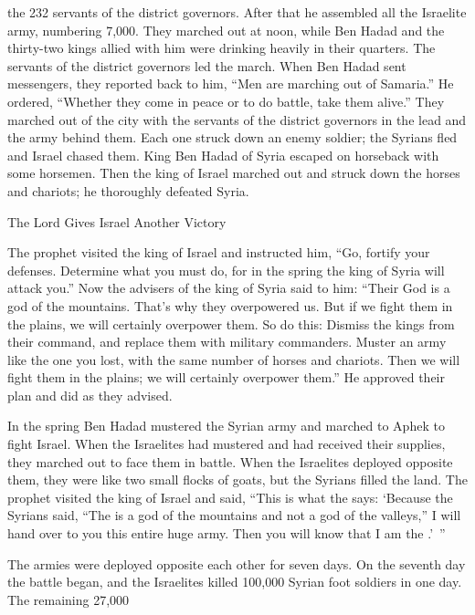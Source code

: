 {the 232
servants
of the district
governors.
After
that he assembled
all
the Israelite
army,
numbering 7,000.
They marched
out at noon,
while Ben Hadad
and the thirty-two
kings
allied with him
were drinking
heavily
in their quarters.
The servants
of the district
governors
led
the march.
When Ben Hadad
sent
messengers, they reported back
to him, “Men
are marching out
of Samaria.”
He ordered,
“Whether
they come
in peace
or
to do battle,
take
them alive.”
They marched out
of the city
with the servants
of the district
governors
in the lead and the army
behind them.
Each one
struck
down an
enemy soldier;
the Syrians
fled
and Israel
chased
them. King
Ben Hadad
of Syria
escaped
on
horseback
with some horsemen.
Then
the king
of Israel
marched out and struck
down the horses
and chariots;
he thoroughly
defeated
Syria.
\par }{\SH The Lord Gives Israel Another Victory
\par }{\PP {}The prophet
visited
the king
of Israel
and instructed
him, “Go,
fortify
your defenses. Determine
what
you must do,
for
in the spring
the king
of Syria
will attack you.”
Now the advisers
of the king
of Syria
said
to him: “Their God
is a god
of the mountains.
That’s why
they overpowered
us. But if
we fight
them in
the plains,
we will certainly
overpower
them.
So do
this: Dismiss the kings
from their command, and replace
them with military commanders.
Muster
an army
like the one
you
lost,
with the same number
of horses
and chariots.
Then we will fight
them in the plains;
we will certainly
overpower
them.”
He approved
their plan
and did
as they advised.
\par }{\PP {}In the spring
Ben Hadad
mustered
the Syrian
army and marched
to Aphek
to fight
Israel.
When
the Israelites
had mustered
and had received their supplies,
they marched out
to face them
in
battle. When the Israelites
deployed
opposite
them, they were like two
small flocks
of goats,
but the Syrians
filled
the
land.
The prophet
visited
the king
of Israel
and said,
“This is what
the {}
says: ‘Because
the Syrians
said,
“The
{}
is a god
of the mountains
and not
a god
of the valleys,”
I will
hand
over to you this
entire
huge
army. Then you will know
that
I am
the {}.’ ”
\par }{\PP {}The armies were
deployed
opposite
each other
for seven
days.
On
the seventh
day
the battle
began,
and the Israelites
killed
100,000
Syrian
foot
soldiers in one
day.
The remaining
27,000
}
